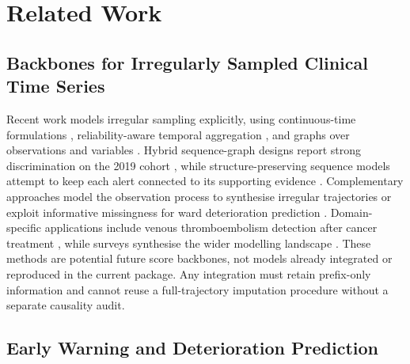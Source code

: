 \section{Related Work}
\label{sec:related}

\subsection{Backbones for Irregularly Sampled Clinical Time Series}

Recent work models irregular sampling explicitly, using continuous-time formulations \citep{shen2026enhancing}, reliability-aware temporal aggregation \citep{kim2026retamamba}, and graphs over observations and variables \citep{yalavarthi2024grafiti}. Hybrid sequence-graph designs report strong discrimination on the 2019 cohort \citep{khorram2026early}, while structure-preserving sequence models attempt to keep each alert connected to its supporting evidence \citep{ou2026sepsislens}. Complementary approaches model the observation process to synthesise irregular trajectories \citep{mehdizavareh2026informative} or exploit informative missingness for ward deterioration prediction \citep{mun2026made}. Domain-specific applications include venous thromboembolism detection after cancer treatment \citep{xu2026bridging}, while surveys synthesise the wider modelling landscape \citep{sun2026review}. These methods are potential future score backbones, not models already integrated or reproduced in the current package. Any integration must retain prefix-only information and cannot reuse a full-trajectory imputation procedure without a separate causality audit.

\subsection{Early Warning and Deterioration Prediction}

